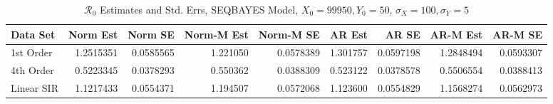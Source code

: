 \documentclass[12pt]{article}
\newcommand{\rr}{\ensuremath{\mathcal{R}_0}}
\begin{document}
\begin{table}[H]
	
	\caption{\label{tab:}$\rr$ Estimates and Std. Errs, SEQBAYES Model,
		$X_0 = 99950, Y_0 = 50$, $\sigma_X = 100, \sigma_Y = 5$}
	\centering
	\begin{footnotesize}
	\begin{tabular}[t]{l|r|r|r|r|r|r|r|r}
		\hline
		Data Set & Norm Est & Norm SE & Norm-M Est & Norm-M SE & AR Est & AR SE & AR-M Est & AR-M SE\\
		\hline
		1st Order & 1.2515351 & 0.0585565 & 1.221050 & 0.0578389 & 1.301757 & 0.0597198 & 1.2848494 & 0.0593307\\
		\hline
		4th Order & 0.5223345 & 0.0378293 & 0.550362 & 0.0388309 & 0.523122 & 0.0378578 & 0.5506554 & 0.0388413\\
		\hline
		Linear SIR & 1.1217433 & 0.0554371 & 1.194507 & 0.0572068 & 1.123600 & 0.0554829 & 1.1568274 & 0.0562973\\
		\hline
	\end{tabular}
	\end{footnotesize}
\end{table}
\end{document}
